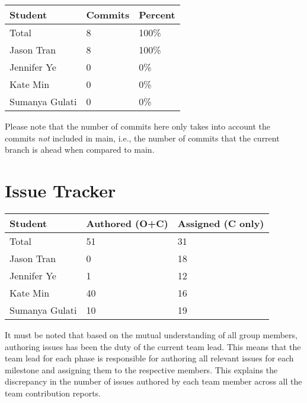 \documentclass{article}
\begin{document}
\begin{table}[H]
\centering
\begin{tabular}{lll}
\toprule
\textbf{Student} & \textbf{Commits} & \textbf{Percent}\\
\midrule
Total & 8 & 100\% \\
Jason Tran & 8 & 100\% \\
Jennifer Ye & 0 & 0\% \\
Kate Min & 0 & 0\% \\
Sumanya Gulati & 0 & 0\% \\
\bottomrule
\end{tabular}
\end{table}

Please note that the number of commits here only takes into account the commits \emph{not}
included in main, i.e., the number of commits that the current branch is ahead when compared 
to main.

\section{Issue Tracker}

\begin{table}[H]
\centering
\begin{tabular}{lll}
\toprule
\textbf{Student} & \textbf{Authored (O+C)} & \textbf{Assigned (C only)}\\
\midrule
Total & 51 & 31 \\
Jason Tran & 0 & 18 \\
Jennifer Ye & 1 & 12 \\
Kate Min & 40 & 16 \\
Sumanya Gulati & 10 & 19 \\
\bottomrule
\end{tabular}
\end{table}

It must be noted that based on the mutual understanding of all group members, authoring issues has been the duty of the 
current team lead. This means that the team lead for each phase is responsible for authoring all relevant issues for each 
milestone and assigning them to the respective members. This explains the discrepancy in the number of issues authored by 
each team member across all the team contribution reports.
\end{document}
